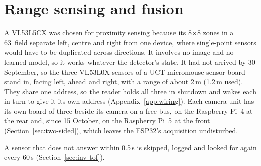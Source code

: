 \section{Range sensing and fusion}
\label{sec:impl-tof}

A VL53L5CX was chosen for proximity sensing because its 8$\times$8 zones in a 63\textdegree\ field separate left, centre and right from one device, where single-point sensors would have to be duplicated across directions. It involves no image and no learned model, so it works whatever the detector's state. It had not arrived by 30 September, so the three VL53L0X sensors of a UCT micromouse sensor board stand in, facing left, ahead and right, with a range of about 2\,m (1.2\,m used). They share one address, so the reader holds all three in shutdown and wakes each in turn to give it its own address (Appendix~\ref{app:wiring}). Each camera unit has its own board of three beside its camera on a free bus, on the Raspberry Pi~4 at the rear and, since 15 October, on the Raspberry Pi~5 at the front (Section~\ref{sec:two-sided}), which leaves the ESP32's acquisition undisturbed.

A sensor that does not answer within 0.5\,s is skipped, logged and looked for again every 60\,s (Section~\ref{sec:inv-tof}).

